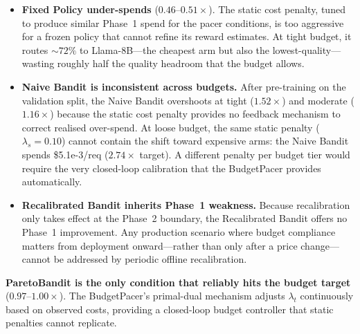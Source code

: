 \begin{itemize}[nosep,leftmargin=*]
  \item \textbf{Fixed Policy under-spends} ($0.46$--$0.51\times$).
    The static cost penalty, tuned to produce similar Phase~1 spend
    for the pacer conditions, is too aggressive for a frozen policy
    that cannot refine its reward estimates.
    At tight budget, it routes ${\sim}72\%$ to Llama-8B---the cheapest arm
    but also the lowest-quality---wasting roughly half the quality
    headroom that the budget allows.

  \item \textbf{Naive Bandit is inconsistent across budgets.}
    After pre-training on the validation split, the Naive Bandit
    overshoots at tight ($1.52\times$) and moderate ($1.16\times$)
    because the static cost penalty provides no feedback mechanism to
    correct realised over-spend.
    At loose budget, the same static penalty ($\lambda_s{=}0.10$)
    cannot contain the shift toward expensive arms: the Naive Bandit
    spends \$5.1e-3/req ($2.74\times$ target).
    A different penalty per budget tier would require the very
    closed-loop calibration that the BudgetPacer provides automatically.

  \item \textbf{Recalibrated Bandit inherits Phase~1 weakness.}
    Because recalibration only takes effect at the Phase~2 boundary,
    the Recalibrated Bandit offers no Phase~1 improvement.
    Any production scenario where budget compliance matters from
    deployment onward---rather than only after a price change---cannot
    be addressed by periodic offline recalibration.
\end{itemize}

\noindent
\textbf{ParetoBandit is the only condition that reliably hits the
budget target} ($0.97$--$1.00\times$).  The BudgetPacer's
primal-dual mechanism adjusts $\lambda_t$ continuously based on
observed costs, providing a closed-loop budget controller that
static penalties cannot replicate.


